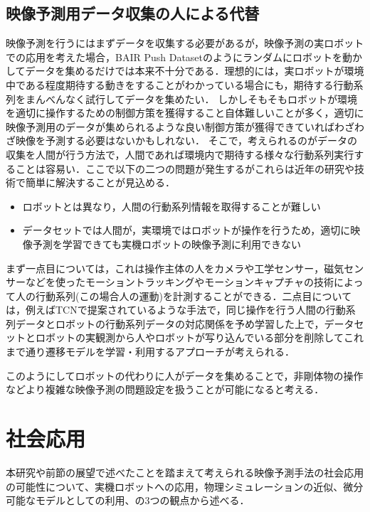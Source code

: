 \subsection{映像予測用データ収集の人による代替}
映像予測を行うにはまずデータを収集する必要があるが，映像予測の実ロボットでの応用を考えた場合，BAIR Push Datasetのようにランダムにロボットを動かしてデータを集めるだけでは本来不十分である．理想的には，実ロボットが環境中である程度期待する動きをすることがわかっている場合にも，期待する行動系列をまんべんなく試行してデータを集めたい．
しかしそもそもロボットが環境を適切に操作するための制御方策を獲得すること自体難しいことが多く，適切に映像予測用のデータが集められるような良い制御方策が獲得できていればわざわざ映像を予測する必要はないかもしれない．
そこで，考えられるのがデータの収集を人間が行う方法で，人間であれば環境内で期待する様々な行動系列実行することは容易い．ここで以下の二つの問題が発生するがこれらは近年の研究や技術で簡単に解決することが見込める．
\begin{itemize}
    \item ロボットとは異なり，人間の行動系列情報を取得することが難しい
    \item データセットでは人間が，実環境ではロボットが操作を行うため，適切に映像予測を学習できても実機ロボットの映像予測に利用できない
\end{itemize}

まず一点目については，これは操作主体の人をカメラや工学センサー，磁気センサーなどを使ったモーショントラッキングやモーションキャプチャの技術によって人の行動系列(この場合人の運動)を計測することができる．二点目については，例えばTCN\cite{Sermanet_2018}で提案されているような手法で，同じ操作を行う人間の行動系列データとロボットの行動系列データの対応関係を予め学習した上で，データセットとロボットの実観測から人やロボットが写り込んでいる部分を削除してこれまで通り遷移モデルを学習・利用するアプローチが考えられる．

このようにしてロボットの代わりに人がデータを集めることで，非剛体物の操作などより複雑な映像予測の問題設定を扱うことが可能になると考える．

\section{社会応用}

本研究や前節の展望で述べたことを踏まえて考えられる映像予測手法の社会応用の可能性について、実機ロボットへの応用，物理シミュレーションの近似、微分可能なモデルとしての利用、の3つの観点から述べる．

